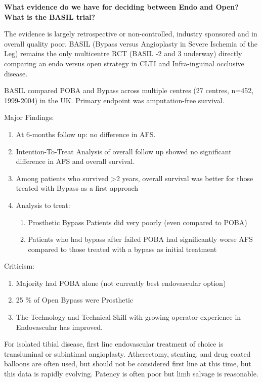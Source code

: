 \documentclass[
]{book}
\begin{document}
\textbf{What evidence do we have for deciding between Endo and Open? What is
the BASIL trial?}

The evidence is largely retrospective or non-controlled, industry
sponsored and in overall quality poor. BASIL (Bypass versus Angioplasty
in Severe Ischemia of the Leg) remains the only multicentre RCT (BASIL
-2 and 3 underway) directly comparing an endo versus open strategy in
CLTI and Infra-inguinal occlusive disease.~

BASIL compared POBA and Bypass across multiple centres (27 centres,
n=452, 1999-2004) in the UK. Primary endpoint was amputation-free
survival. \citep{bradburyBypassAngioplastySevere2005}

Major Findings:

\begin{enumerate}
\def\labelenumi{\arabic{enumi}.}
\item
  At 6-months follow up: no difference in AFS.
\item
  Intention-To-Treat Analysis of overall follow up showed no
  significant difference in AFS and overall survival.
\item
  Among patients who survived \textgreater2 years, overall survival was better
  for those treated with Bypass as a first approach
\item
  Analysis to treat:~

  \begin{enumerate}
  \def\labelenumii{\arabic{enumii}.}
  \item
    Prosthetic Bypass Patients did very poorly (even compared to
    POBA)~~
  \item
    Patients who had bypass after failed POBA had significantly
    worse AFS compared to those treated with a bypass as initial
    treatment
  \end{enumerate}
\end{enumerate}

Criticism:

\begin{enumerate}
\def\labelenumi{\arabic{enumi}.}
\item
  Majority had POBA alone (not currently best endovascular option)
\item
  25 \% of Open Bypass were Prosthetic
\item
  The Technology and Technical Skill with growing operator experience
  in Endovascular has improved.
\end{enumerate}

For isolated tibial disease, first line endovascular treatment of choice
is transluminal or subintimal angioplasty. Atherectomy, stenting, and
drug coated balloons are often used, but should not be considered first
line at this time, but this data is rapidly evolving. Patency is often
poor but limb salvage is reasonable.\citep{popplewell2019, kayssi2016, mustapha2016}
\end{document}
